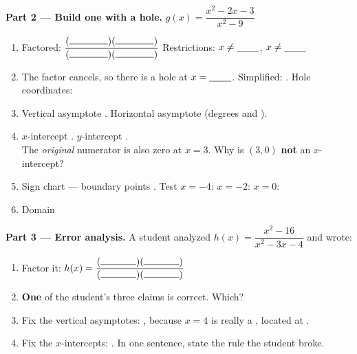 \documentclass[10pt]{article}
\begin{document}
\begin{tcolorbox}[colback=white, colframe=black!40, title=\textbf{Tier A --- Approaching Proficiency},
    fonttitle=\bfseries, arc=1.5mm, left=3mm, right=3mm, top=2mm, bottom=2mm, breakable]
\vspace{4pt}
\textbf{Part 2 --- Build one with a hole.} \; $g(x)=\dfrac{x^2-2x-3}{x^2-9}$
\begin{enumerate}[label=\arabic*., leftmargin=2.1em, itemsep=4pt]
  \item Factored: $\dfrac{(\rule{1.4cm}{0.4pt})(\rule{1.4cm}{0.4pt})}%
        {(\rule{1.4cm}{0.4pt})(\rule{1.4cm}{0.4pt})}$ \quad Restrictions: $x\neq\blank{0.8cm}$,
        $x\neq\blank{0.8cm}$
  \item The factor \blank{1.4cm} cancels, so there is a hole at $x=\blank{0.8cm}$. Simplified:
        \blank{2.0cm}. Hole coordinates: \blank{1.8cm}
  \item Vertical asymptote \blank{1.4cm}. \quad Horizontal asymptote \blank{1.4cm} (degrees
        \blank{0.6cm} and \blank{0.6cm}).
  \item $x$-intercept \blank{1.6cm}. \quad $y$-intercept \blank{1.6cm}. \\[3pt]
        The \emph{original} numerator is also zero at $x=3$. Why is $(3,0)$ \textbf{not} an
        $x$-intercept? \blank{6.0cm}
  \item Sign chart --- boundary points \blank{2.4cm}. \; Test $x=-4$: \blank{1.0cm} \;
        $x=-2$: \blank{1.0cm} \; $x=0$: \blank{1.0cm}
  \item Domain \blank{5.0cm}
\end{enumerate}

\vspace{4pt}
\textbf{Part 3 --- Error analysis.} A student analyzed $h(x)=\dfrac{x^2-16}{x^2-3x-4}$ and wrote:
\begin{center}
\end{center}
\begin{enumerate}[label=(\alph*), leftmargin=2.1em, itemsep=5pt]
  \item Factor it: $h(x)=\dfrac{(\rule{1.3cm}{0.4pt})(\rule{1.3cm}{0.4pt})}%
        {(\rule{1.3cm}{0.4pt})(\rule{1.3cm}{0.4pt})}$
  \item \textbf{One} of the student's three claims is correct. Which? \blank{2.6cm}
  \item Fix the vertical asymptotes: \blank{2.2cm}, because $x=4$ is really a \blank{1.4cm},
        located at \blank{1.8cm}.
  \item Fix the $x$-intercepts: \blank{2.2cm}. In one sentence, state the rule the student broke.
\end{enumerate}
\end{tcolorbox}
\end{document}
